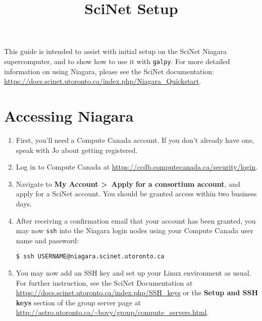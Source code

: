 \documentclass[12pt]{article}
\title{SciNet Setup}
\author{}
\date{}
\begin{document}
\maketitle
\thispagestyle{fancy}
This guide is intended to assist with initial setup on the SciNet Niagara supercomputer, and to show how to use it with \texttt{galpy}. For more detailed information on using Niagara, please see the SciNet documentation: \url{https://docs.scinet.utoronto.ca/index.php/Niagara_Quickstart}.
\section{Accessing Niagara}
\begin{enumerate}[leftmargin=*]
\item First, you'll need a Compute Canada account. If you don't already have one, speak with Jo about getting registered.
\item Log in to Compute Canada at \url{https://ccdb.computecanada.ca/security/login}.
\item Navigate to \textbf{My Account \textgreater \ Apply for a consortium account}, and apply for a SciNet account. You should be granted access within two business days.
\item After receiving a confirmation email that your account has been granted, you may now \texttt{ssh} into the Niagara login nodes using your Compute Canada user name and password:
\begin{lstlisting}
$ ssh USERNAME@niagara.scinet.utoronto.ca
\end{lstlisting}
\item You may now add an SSH key and set up your Linux environment as usual. For further instruction, see the SciNet Documentation at \url{https://docs.scinet.utoronto.ca/index.php/SSH_keys} or the \textbf{Setup and SSH keys} section of the group server page at \url{http://astro.utoronto.ca/~bovy/group/compute_servers.html}.
\end{enumerate}
\end{document}
